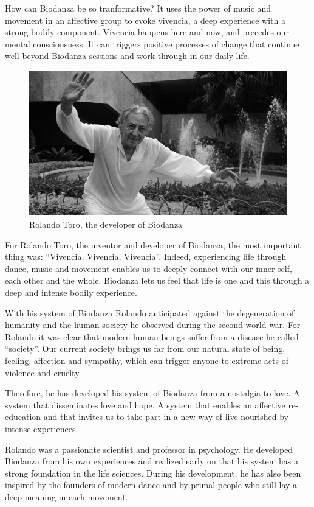 \documentclass[
  11pt,
]{book}
\begin{document}
How can Biodanza be so tranformative?
It uses the power of music and movement in an affective group to evoke vivencia, a deep experience with a strong bodily component. Vivencia happens here and now, and precedes our mental consciousness. It can triggers positive processes of change that continue well beyond Biodanza sessions and work through in our daily life.

\begin{figure}

{\centering \includegraphics[width=0.45\linewidth]{./figs/rolando} 

}

\caption{Rolando Toro, the developer of Biodanza}\label{fig:rolandoToro}
\end{figure}

For Rolando Toro, the inventor and developer of Biodanza, the most important thing was: ``Vivencia, Vivencia, Vivencia''. Indeed, experiencing life through dance, music and movement enables us to deeply connect with our inner self, each other and the whole. Biodanza lets us feel that life is one and this through a deep and intense bodily experience.

With his system of Biodanza Rolando anticipated against the degeneration of humanity and the human society he observed during the second world war. For Rolando it was clear that modern human beings suffer from a disease he called ``society''. Our current society brings us far from our natural state of being, feeling, affection and sympathy, which can trigger anyone to extreme acts of violence and cruelty.

Therefore, he has developed his system of Biodanza from a nostalgia to love. A system that disseminates love and hope. A system that enables an affective re-education and that invites us to take part in a new way of live nourished by intense experiences.

Rolando was a passionate scientist and professor in psychology. He developed Biodanza from his own experiences and realized early on that his system has a strong foundation in the life sciences. During his development, he has also been inspired by the founders of modern dance and by primal people who still lay a deep meaning in each movement.
\end{document}

